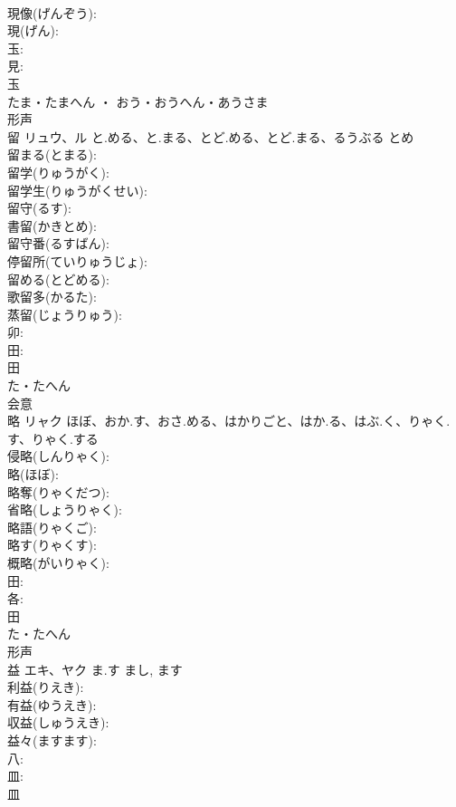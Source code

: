 \documentclass[8pt]{extreport}
\begin{document}
\begin{CJK}{UTF8}{min}
\\	現像(げんぞう): 
\\	現(げん): 
\\	玉: 
\\	見: 
\\	玉	
\\	たま・たまへん ・ おう・おうへん・あうさま	
\\	形声 
\\	留	リュウ、ル	と.める、と.まる、とど.める、とど.まる、るうぶる	とめ	
\\	留まる(とまる): 
\\	留学(りゅうがく): 
\\	留学生(りゅうがくせい): 
\\	留守(るす): 
\\	書留(かきとめ): 
\\	留守番(るすばん): 
\\	停留所(ていりゅうじょ): 
\\	留める(とどめる): 
\\	歌留多(かるた): 
\\	蒸留(じょうりゅう): 
\\	卯: 
\\	田: 
\\	田	
\\	た・たへん	
\\	会意 
\\	略	リャク	ほぼ、おか.す、おさ.める、はかりごと、はか.る、はぶ.く、りゃく.す、りゃく.する		
\\	侵略(しんりゃく): 
\\	略(ほぼ): 
\\	略奪(りゃくだつ): 
\\	省略(しょうりゃく): 
\\	略語(りゃくご): 
\\	略す(りゃくす): 
\\	概略(がいりゃく): 
\\	田: 
\\	各: 
\\	田	
\\	た・たへん	
\\	形声 
\\	益	エキ、ヤク	ま.す	まし, ます	
\\	利益(りえき): 
\\	有益(ゆうえき): 
\\	収益(しゅうえき): 
\\	益々(ますます): 
\\	八: 
\\	皿: 
\\	皿	

\end{CJK}
\end{document}
